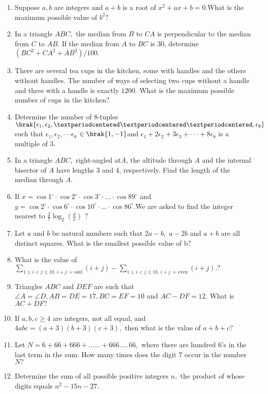 \documentclass{article}
\begin{document}
\begin{enumerate}
\item  Suppose $a, b$ are integers and $a+b$ is a root of $x^{2} + ax + b =0. $What is the maximum possible value of $b^{2}?$ 
\item  In a triangle $ABC,$ the median from $B$ to $ CA $ is perpendicular to the median from $C$ to $AB$. If the median from $A$ to $BC$ is $30$, determine ${(BC^{2} +CA^{2} +AB^{2})}/100.$ 
\item There are several tea cups in the kitchen, some with handles and the others without handles. The number of ways of selecting two cups without a handle and three with a handle is exactly $1200.$ What is the maximum possible number of cups in the kitchen$?$
\item Determine the number of $8$-tuples $\brak{\epsilon_1, \epsilon_2, ·· · , \epsilon_8}$ such that $\epsilon_1, \epsilon_2, ·· · \epsilon_8$ $\in \brak{1, -1 }$and $\epsilon_1 +2\epsilon_2 +3\epsilon_3 + ·· · +8 \epsilon_8$
is a multiple of $3.$ 
\item  In a triangle $ABC,$ right-angled at$A$, the altitude through $A$ and the internal bisector of $A$ have lengths $3$ and $ 4$, respectively. Find the length of the median through $A$. 
\item If $ x = \cos 1^\circ \cdot \cos 2^\circ \cdot \cos 3^\circ \cdot \ldots \cdot \cos 89^\circ$ and $y = \cos 2^\circ \cdot \cos 6^\circ \cdot \cos 10^\circ \cdot \ldots \cdot \cos 86^\circ$.We are asked to find the integer nearest to $\frac{2}{7} \log_2 \left( \frac{y}{x} \right)$ $?$
\item  Let $a$ and $b$ be natural numbers such that $2a - b,$ $a - 2b$ and $a + b$ are all distinct squares. What is the smallest possible value of b$?$ 
\item What is the value of $\sum_{1 \leq i < j \leq 10, \, i + j \, \text{ = odd}} (i + j) - \sum_{1 \leq i < j \leq 10, \, i + j \, \text{ = even}} (i + j). ?$
\item Triangles $ABC$ and $DEF$ are such that $\angle{A} = \angle{D,} AB = DE = 17, BC = EF = 10$ and $AC - DF = 12.$ What is $AC +DF?$ 
\item  If $a, b, c \geq 4$ are integers, not all equal, and $ 4abc =(a+3)(b+3)(c+3),$ then what is the value of $ a + b + c?$ 
\item  Let $N = 6 + 66 + 666 +...... + 666 ..... 66,$ where there are hundred $6’$s in the last term in the sum. How many times does the digit $7$ occur in the number $N?$ 
\item  Determine the sum of all possible positive integers $n,$ the product of whose digits equals $n^{2} - 15n - 27.$ 

\end{enumerate}
\end{document}
